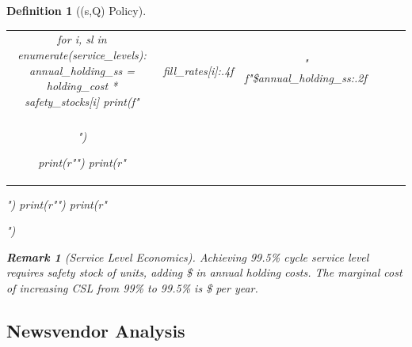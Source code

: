 \documentclass[a4paper, 11pt]{article}
\newtheorem{definition}{Definition}[section]
\newtheorem{remark}{Remark}[section]
\begin{document}
\begin{definition}[(s,Q) Policy]
\begin{pycode}
\begin{table}[htbp]
\begin{tabular}{cccccc}
for i, sl in enumerate(service_levels):
    annual_holding_ss = holding_cost * safety_stocks[i]
    print(f"{sl:.1%
          f"{reorder_points[i]:.0f} & {fill_rates[i]:.4f} & "
          f"\${annual_holding_ss:.2f} \\\\")

print(r"\bottomrule")
print(r"\end{tabular}")
print(r"\label{tab:safety}")
print(r"\end{table}")
\end{pycode}

\begin{remark}[Service Level Economics]
Achieving 99.5\% cycle service level requires safety stock of 
units, adding \$ in annual holding costs.
The marginal cost of increasing CSL from 99\% to 99.5\% is
\$ per year.
\end{remark}

\subsection{Newsvendor Analysis}


\end{definition}
\end{document}
